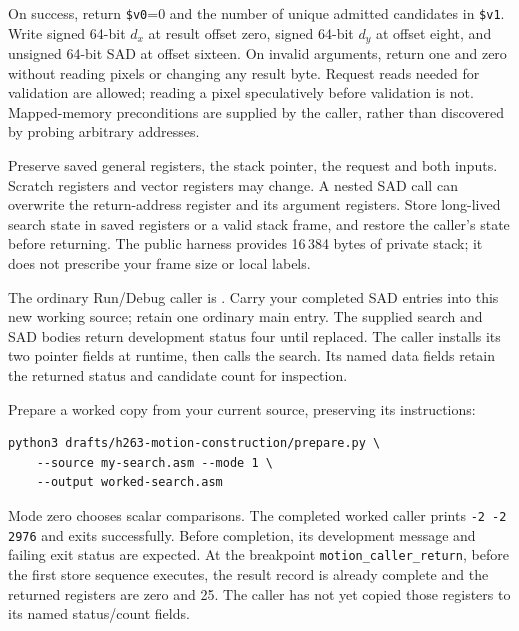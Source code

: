 On success, return \texttt{\$v0}=0 and the number of unique admitted candidates
in \texttt{\$v1}. Write signed 64-bit $d_x$ at result offset zero, signed
64-bit $d_y$ at offset eight, and unsigned 64-bit SAD at offset sixteen.
On invalid arguments, return one and zero without reading pixels or changing
any result byte. Request reads needed for validation are allowed; reading a
pixel speculatively before validation is not. Mapped-memory preconditions are
supplied by the caller, rather than discovered by probing arbitrary addresses.

Preserve saved general registers, the stack pointer, the request and both
inputs. Scratch registers and vector registers may change. A nested SAD call
can overwrite the return-address register and its argument registers. Store
long-lived search state in saved registers or a valid stack frame, and restore
the caller's state before returning. The public harness provides 16\,384 bytes
of private stack; it does not prescribe your frame size or local labels.

The ordinary Run/Debug caller is
. Carry your completed SAD entries
into this new working source; retain one ordinary main entry. The supplied search
and SAD bodies return development status four until replaced. The caller installs
its two pointer fields at runtime, then calls the search. Its named data fields
retain the returned status and candidate count for inspection.

Prepare a worked copy from your current source, preserving its instructions:
\begin{verbatim}
python3 drafts/h263-motion-construction/prepare.py \
    --source my-search.asm --mode 1 \
    --output worked-search.asm
\end{verbatim}
Mode zero chooses scalar comparisons. The completed worked caller prints
\texttt{-2 -2 2976} and exits successfully. Before completion, its development
message and failing exit status are expected. At the breakpoint
\texttt{motion\_caller\_return}, before the first store sequence executes, the
result record is already complete and the returned registers are zero and 25.
The caller has not yet copied those registers to its named status/count fields.
